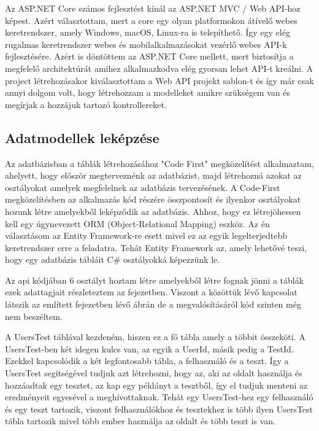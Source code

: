 Az ASP.NET Core számos fejlesztést kínál az ASP.NET MVC / Web API-hoz képest. Azért választottam, mert a core egy olyan platformokon átívelő webes keretrendszer, amely Windows, macOS, Linux-ra is telepíthető. Így egy elég rugalmas keretrendszer webes és mobilalkalmazásokat vezérlő webes API-k fejlesztésére. Azért is döntöttem az ASP.NET Core mellett, mert biztosítja a megfelelő architektúrát amihez alkalmazkodva elég gyorsan lehet API-t kreálni. A project létrehozásakor kiválasztottam a Web API projekt sablon-t és így már csak annyi dolgom volt, hogy létrehozzam a modelleket amikre szükségem van és megírjak a hozzájuk tartozó kontrollereket.

\subsection{Adatmodellek leképzése}

Az adatbázisban a táblák létrehozásához "Code First" megközelítést alkalmaztam, ahelyett, hogy először megterveznénk az adatbázist, majd létrehozná azokat az osztályokat amelyek megfelelnek az adatbázis tervezésének. A Code-First megközelítésben az alkalmazás kód részére összpontosít és ilyenkor osztályokat hozunk létre amelyekből leképződik az adatbázis. Ahhoz, hogy ez létrejöhessen kell egy úgynevezett ORM (Object-Relational Mapping) eszköz. Az én választásom az Entity Framework-re esett mivel ez az egyik legelterjedtebb keretrendszer erre a feladatra. Tehát Entity Framework az, amely lehetővé teszi, hogy egy adatbázis tábláit C\# osztályokká képezzünk le. \newline

Az api kódjában 6 osztályt hoztam létre amelyekből létre fognak jönni a táblák ezek adattagjait részleteztem az  fejezetben.
Viszont a közöttük lévő kapcsolat látszik az említett fejezetben lévő ábrán de a megvalósításáról kód szinten még nem beszéltem. \newline

A UsersTest táblával kezdeném, hiszen ez a fő tábla amely a többit összeköti.
A UsersTest-ben két idegen kulcs van, az egyik a UserId, másik pedig a TestId. Ezekkel kapcsolódik a két legfontosabb tábla, a felhasználó és a teszt. Így a UsersTest segítségével tudjuk azt létrehozni, hogy az, aki az oldalt használja és hozzáadtak egy tesztet, az kap egy példányt a tesztből, így el tudjuk menteni az eredményeit egyesével a meghívottaknak.
Tehát egy UsersTest-hez egy felhasználó és egy teszt tartozik, viszont felhasználókhoz és tesztekhez is több ilyen UsersTest tábla tartozik mivel több ember használja az oldalt és több teszt is van. \newline

